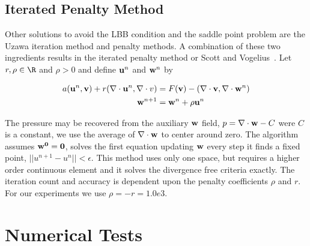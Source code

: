 \subsection{Iterated Penalty Method}

Other solutions to avoid the LBB condition and the saddle point problem are the
Uzawa iteration method and penalty methods.  A combination of these two
ingredients results in the iterated penalty method or Scott and
Vogelius~\cite{ScottVogelius1985}. Let $r,\rho\in\R$ and $\rho > 0$ and define
${\bf u}^n$ and ${\bf w}^n$ by

\begin{align*}
\label{terrel:eqn:IPStokes}
 a({\bf u}^n,{\bf v})+r(\nabla\cdot{\bf u}^n,\nabla\cdot{v}) &=  F({\bf v}) - (\nabla\cdot{\bf v},\nabla\cdot{\bf w}^n)\\
  {\bf w}^{n+1} &= {\bf w}^n + \rho{\bf u}^n
\end{align*}


The pressure may be recovered from the auxiliary ${\bf w}$ field, $p = \nabla\cdot{\bf
  w} - C$ were $C$ is a constant, we use the average of $\nabla\cdot{\bf w}$ to center
around zero. The algorithm assumes ${\bf w^0} = \bf{0}$, solves the first
equation updating $\bf{w}$ every step it finds a fixed point, $||u^{n+1} -
u^{n}|| < \epsilon$. This method uses only one space, but requires a higher
order continuous element \cite{ScottVogelius1985a} and it solves the divergence free
criteria exactly.  The iteration count and accuracy is dependent upon
the penalty coefficients $\rho$ and $r$.  For our experiments we use ${\rho =
  -r = 1.0e3}$.

\section{Numerical Tests}
\label{terrel:sec:Results}

